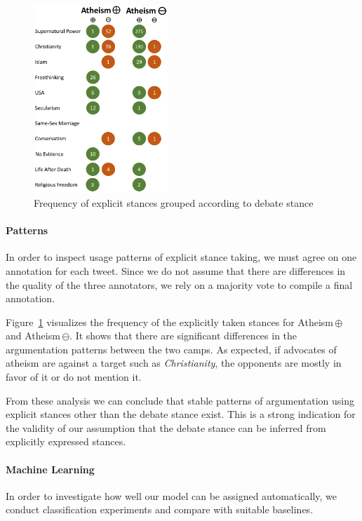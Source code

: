 \documentclass[11pt]{article}
\begin{document}
\begin{figure}[ht!]
\centering
  \includegraphics[width=0.45\textwidth]{figures/patterns_flat.png}
  \caption{Frequency of explicit stances grouped according to debate stance}
  \label{fig:patterns_flat}
\end{figure}

\paragraph{Patterns}
In order to inspect usage patterns of explicit stance taking, we must agree on one annotation for each tweet.
Since we do not assume that there are differences in the quality of the three annotators, we rely on a majority vote to compile a final annotation. 

Figure~\ref{fig:patterns_flat} visualizes the frequency of the explicitly taken stances for Atheism\,$\oplus$ and Atheism\,$\ominus$.
It shows that there are significant differences in the argumentation patterns between the two camps.
As expected, if advocates of atheism are against a target such as \textit{Christianity}, the opponents are mostly in favor of it or do not mention it.

From these analysis we can conclude that stable patterns of argumentation using explicit stances other than the debate stance exist.
This is a strong indication for the validity of our assumption that the debate stance can be inferred from explicitly expressed stances.

\paragraph{Machine Learning}

In order to investigate how well our model can be assigned automatically, we conduct classification experiments and compare with suitable baselines.
\end{document}
